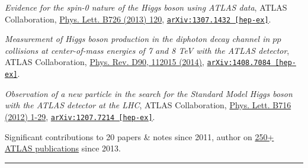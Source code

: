 \documentclass{letter}
\begin{document}
\textit{Evidence for the spin-0 nature of the Higgs boson using ATLAS data}, ATLAS Collaboration, \href{http://www.sciencedirect.com/science/article/pii/S0370269313006527?np=y}{Phys. Lett. B726 (2013) 120}, \href{https://arxiv.org/abs/1307.1432}{\texttt{arXiv:1307.1432 [hep-ex]}}.

\textit{Measurement of Higgs boson production in the diphoton decay channel in $pp$ collisions at center-of-mass energies of 7 and 8 TeV with the ATLAS detector}, ATLAS Collaboration, \href{http://journals.aps.org/prd/abstract/10.1103/PhysRevD.90.112015}{Phys. Rev. D90, 112015 (2014)}, \href{http://arxiv.org/abs/1408.7084}{\texttt{arXiv:1408.7084 [hep-ex]}}.

\textit{Observation of a new particle in the search for the Standard Model Higgs boson with the ATLAS detector at the LHC}, ATLAS Collaboration, \href{http://www.sciencedirect.com/science/article/pii/S037026931200857X}{Phys. Lett. B716 (2012) 1-29}, \href{https://arxiv.org/abs/1207.7214}{\texttt{arXiv:1207.7214 [hep-ex]}}.

\begin{flushright}
Significant contributions to 20 papers \& notes since 2011, author on \href{https://twiki.cern.ch/twiki/bin/view/AtlasPublic}{250+ ATLAS publications} since 2013.\\
\end{flushright}


\begin{flushleft}
  \Large{\textsc{\textbf{\color{Maroon}{Conference Presentations}}}}
  \vspace{1pt} %
  \hrule
\end{flushleft}
\end{document}
